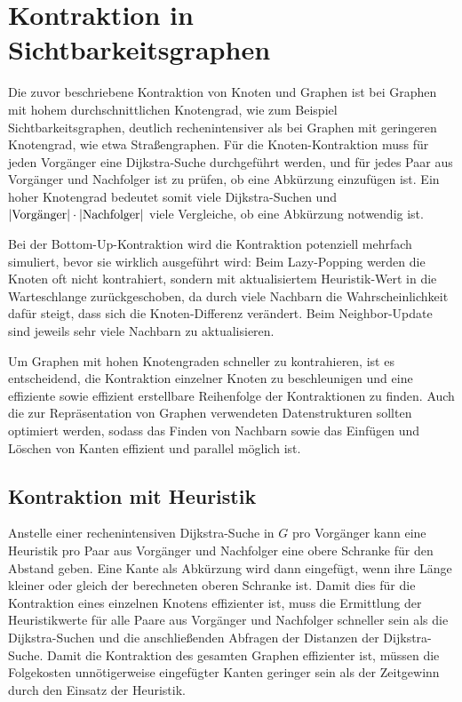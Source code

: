 \chapter{Kontraktion in Sichtbarkeitsgraphen}\label{chapter:kontraktion}

Die zuvor beschriebene Kontraktion von Knoten und Graphen ist bei Graphen mit hohem durchschnittlichen Knotengrad, wie zum Beispiel Sichtbarkeitsgraphen, deutlich rechenintensiver als bei Graphen mit geringeren Knotengrad, wie etwa Straßengraphen.
Für die Knoten-Kontraktion muss für jeden Vorgänger eine Dijkstra-Suche durchgeführt werden, und für jedes Paar aus Vorgänger und Nachfolger ist zu prüfen, ob eine Abkürzung einzufügen ist.
Ein hoher Knotengrad bedeutet somit viele Dijkstra-Suchen und $\abs{\text{Vorgänger}} \cdot \abs{\text{Nachfolger}}$ viele Vergleiche, ob eine Abkürzung notwendig ist.

Bei der Bottom-Up-Kontraktion wird die Kontraktion potenziell mehrfach simuliert, bevor sie wirklich ausgeführt wird:
Beim Lazy-Popping werden die Knoten oft nicht kontrahiert, sondern mit aktualisiertem Heuristik-Wert in die Warteschlange zurückgeschoben, da durch viele Nachbarn die Wahrscheinlichkeit dafür steigt, dass sich die Knoten-Differenz verändert.
Beim Neighbor-Update sind jeweils sehr viele Nachbarn zu aktualisieren.

Um Graphen mit hohen Knotengraden schneller zu kontrahieren, ist es entscheidend, die Kontraktion einzelner Knoten zu beschleunigen und eine effiziente sowie effizient erstellbare Reihenfolge der Kontraktionen zu finden.
Auch die zur Repräsentation von Graphen verwendeten Datenstrukturen sollten optimiert werden, sodass das Finden von Nachbarn sowie das Einfügen und Löschen von Kanten effizient und parallel möglich ist.

\section{Kontraktion mit Heuristik}

Anstelle einer rechenintensiven Dijkstra-Suche in $G$ pro Vorgänger kann eine Heuristik pro Paar aus Vorgänger und Nachfolger eine obere Schranke für den Abstand geben.
Eine Kante als Abkürzung wird dann eingefügt, wenn ihre Länge kleiner oder gleich der berechneten oberen Schranke ist.
Damit dies für die Kontraktion eines einzelnen Knotens effizienter ist, muss die Ermittlung der Heuristikwerte für alle Paare aus Vorgänger und Nachfolger schneller sein als die Dijkstra-Suchen und die anschließenden Abfragen der Distanzen der Dijkstra-Suche.
Damit die Kontraktion des gesamten Graphen effizienter ist, müssen die Folgekosten unnötigerweise eingefügter Kanten geringer sein als der Zeitgewinn durch den Einsatz der Heuristik.

